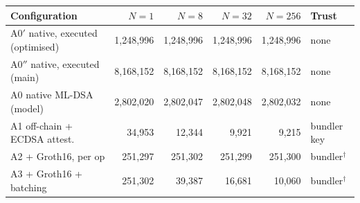 \begin{tabular}{lrrrrl}
\toprule
Configuration & $N=1$ & $N=8$ & $N=32$ & $N=256$ & Trust \\
\midrule
A0$'$ native, executed (optimised) & 1{,}248{,}996 & 1{,}248{,}996 & 1{,}248{,}996 & 1{,}248{,}996 & none \\
A0$''$ native, executed (main) & 8{,}168{,}152 & 8{,}168{,}152 & 8{,}168{,}152 & 8{,}168{,}152 & none \\
A0 native ML-DSA (model) & 2{,}802{,}020 & 2{,}802{,}047 & 2{,}802{,}048 & 2{,}802{,}032 & none \\
A1 off-chain + ECDSA attest. & 34{,}953 & 12{,}344 & 9{,}921 & 9{,}215 & bundler key \\
A2 + Groth16, per op & 251{,}297 & 251{,}302 & 251{,}299 & 251{,}300 & bundler$^\dagger$ \\
A3 + Groth16 + batching & 251{,}302 & 39{,}387 & 16{,}681 & 10{,}060 & bundler$^\dagger$ \\
\bottomrule
\end{tabular}
